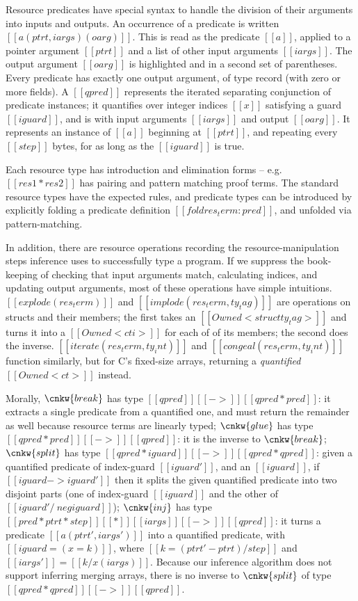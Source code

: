 \documentclass[11pt]{article}%
\begin{document}
Resource predicates have special syntax to handle the division of their
arguments into inputs and outputs. An occurrence of a predicate is written
$[[ a ( ptrt , iargs ) ( oarg )]]$. This is read as the predicate $[[ a ]]$,
applied to a pointer argument $[[ ptrt ]]$ and a list of other input arguments
$[[ iargs ]]$. The output argument $[[ oarg ]]$ is
\colorbox{red!10}{highlighted} and in a second set of parentheses. Every
predicate has exactly one output argument, of type record (with zero or more
fields).
%
A $[[ qpred ]]$ represents the iterated separating conjunction of predicate
instances; it quantifies over integer indices $[[ x ]]$ satisfying a guard $[[
iguard ]]$, and is with input arguments $[[ iargs ]]$ and output $[[ oarg ]]$.
It represents an instance of $[[ a ]]$ beginning at $[[ ptrt ]]$, and repeating
every $[[ step ]]$ bytes, for as long as the $[[ iguard ]]$ is true.


Each resource type has introduction and elimination forms -- e.g.
$[[ res1 * res2 ]]$ has pairing and pattern matching proof terms. The
standard resource types have the expected rules, and predicate types
can be introduced by explicitly folding a predicate definition
$[[ fold res_term : pred ]]$, and unfolded via pattern-matching.


In addition, there are resource operations recording the
resource-manipulation steps inference uses to successfully type a
program.  If we suppress the book-keeping of checking that input
arguments match, calculating indices, and updating output arguments,
most of these operations have simple intuitions.
%
$[[ explode ( res_term ) ]]$ and $[[ implode ( res_term , ty_tag ) ]]$
are operations on structs and their members; the first takes an
$[[ Owned < struct ty_tag > ]]$ and turns it into a
$[[ Owned < cti > ]]$ for each of of its members; the second does the
inverse.  $[[ iterate ( res_term , ty_int ) ]]$ and
$[[ congeal ( res_term , ty_int ) ]]$ function similarly, but for C's
fixed-size arrays, returning a \emph{quantified} $[[ Owned < ct > ]]$
instead.

Morally,
$\cnkw{break}$ has type $[[ qpred ]] [[ -> ]] [[ qpred * pred ]]$: it
extracts a single predicate from a quantified one, and must return the
remainder as well because resource terms are linearly typed;
$\cnkw{glue}$ has type $[[ qpred * pred ]] [[ -> ]] [[ qpred ]]$: it
is the inverse to $\cnkw{break}$; $\cnkw{split}$ has type
$[[ qpred * iguard ]] [[ -> ]] [[ qpred * qpred ]]$: given a
quantified predicate of index-guard $[[ iguard' ]]$, and an
$[[ iguard ]]$, if $[[ iguard -> iguard' ]]$ then it splits the given
quantified predicate into two disjoint parts (one of index-guard
$[[ iguard ]]$ and the other of $[[ iguard' /\ neg iguard ]]$);
$\cnkw{inj}$ has type
$[[ pred * ptrt * step ]] [[ * ]] [[ iargs ]] [[ -> ]] [[ qpred ]]$:
it turns a predicate $[[ a ( ptrt' , iargs' ) ]]$ into a quantified
predicate, with $[[ iguard = ( x = k ) ]]$, where
$[[ k = ( ptrt' - ptrt ) / step ]]$ and
$[[ iargs' ]] = [[ k / x ( iargs ) ]]$. Because our inference
algorithm does not support inferring merging
arrays, there is no inverse to
$\cnkw{split}$ of type $[[ qpred * qpred ]] [[ -> ]] [[ qpred ]]$.
\end{document}
